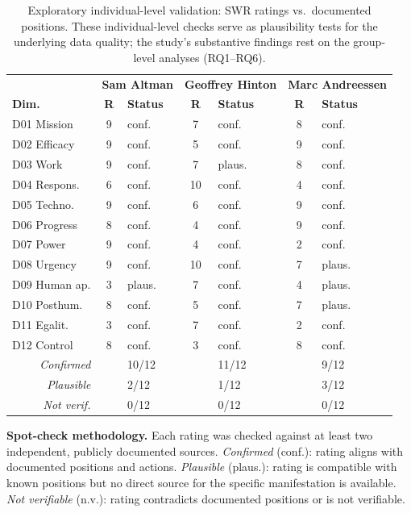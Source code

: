 \documentclass[12pt,a4paper]{article}
\begin{document}
\begin{table}[htbp]
  \centering
  \caption{Exploratory individual-level validation: SWR ratings vs.\ documented positions. These individual-level checks serve as plausibility tests for the underlying data quality; the study's substantive findings rest on the group-level analyses (RQ1--RQ6).}
  \label{tab:spotchecks}
  \footnotesize
  \begin{tabularx}{\textwidth}{l c l c l c l}
    \toprule
    & \multicolumn{2}{c}{\textbf{Sam Altman}} & \multicolumn{2}{c}{\textbf{Geoffrey Hinton}} & \multicolumn{2}{c}{\textbf{Marc Andreessen}} \\
    \textbf{Dim.} & \textbf{R} & \textbf{Status} & \textbf{R} & \textbf{Status} & \textbf{R} & \textbf{Status} \\
    \midrule
    D01 Mission  & 9 & conf. & 7 & conf. & 8 & conf. \\
    D02 Efficacy & 9 & conf. & 5 & conf. & 9 & conf. \\
    D03 Work     & 9 & conf. & 7 & plaus. & 8 & conf. \\
    D04 Respons. & 6 & conf. & 10 & conf. & 4 & conf. \\
    D05 Techno.  & 9 & conf. & 6 & conf. & 9 & conf. \\
    D06 Progress & 8 & conf. & 4 & conf. & 9 & conf. \\
    D07 Power    & 9 & conf. & 4 & conf. & 2 & conf. \\
    D08 Urgency  & 9 & conf. & 10 & conf. & 7 & plaus. \\
    D09 Human ap.& 3 & plaus. & 7 & conf. & 4 & plaus. \\
    D10 Posthum. & 8 & conf. & 5 & conf. & 7 & plaus. \\
    D11 Egalit.  & 3 & conf. & 7 & conf. & 2 & conf. \\
    D12 Control  & 8 & conf. & 3 & conf. & 8 & conf. \\
    \midrule
    \multicolumn{1}{r}{\textit{Confirmed}} & & 10/12 & & 11/12 & & 9/12 \\
    \multicolumn{1}{r}{\textit{Plausible}} & & 2/12 & & 1/12 & & 3/12 \\
    \multicolumn{1}{r}{\textit{Not verif.}} & & 0/12 & & 0/12 & & 0/12 \\
    \bottomrule
  \end{tabularx}
\end{table}

\noindent\textbf{Spot-check methodology.} Each rating was checked against at least two independent, publicly documented sources. \emph{Confirmed} (conf.): rating aligns with documented positions and actions. \emph{Plausible} (plaus.): rating is compatible with known positions but no direct source for the specific manifestation is available. \emph{Not verifiable} (n.v.): rating contradicts documented positions or is not verifiable.
\end{document}
